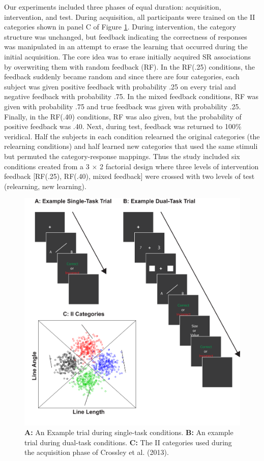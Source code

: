 \documentclass[man,apacite,draftfirst]{apa6}
\begin{document}
Our experiments included three phases of equal duration: acquisition,
intervention, and test. During acquisition, all participants were trained on the
II categories shown in panel C of Figure \ref{fig:test_cats}. During
intervention, the category structure was unchanged, but feedback indicating the
correctness of responses was manipulated in an attempt to erase the learning
that occurred during the initial acquisition. The core idea was to erase
initially acquired SR associations by overwriting them with random feedback
(RF). In the RF(.25) conditions, the feedback suddenly became random and since
there are four categories, each subject was given positive feedback with
probability .25 on every trial and negative feedback with probability .75. In
the mixed feedback conditions, RF was given with probability .75 and true
feedback was given with probability .25. Finally, in the RF(.40) conditions, RF
was also given, but the probability of positive feedback was .40. Next, during
test, feedback was returned to 100\% veridical. Half the subjects in each
condition relearned the original categories (the relearning conditions) and half
learned new categories that used the same stimuli but permuted the
category-response mappings. Thus the study included six conditions created from
a 3 $\times$ 2 factorial design where three levels of intervention feedback
[RF(.25), RF(.40), mixed feedback] were crossed with two levels of test
(relearning, new learning).

\begin{figure}[t]
\centering \includegraphics[width=1.0\textwidth]{../figures/fig_trials.pdf}
  \caption{ \textbf{A:} An Example trial during single-task conditions.
\textbf{B:} An example trial during dual-task conditions. \textbf{C:} The II
categories used during the acquisition phase of Crossley et al. (2013). }
  \label{fig:test_cats}
\end{figure}
\end{document}
